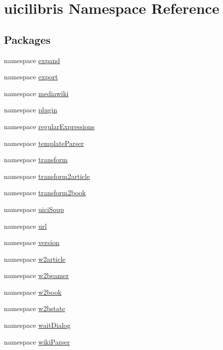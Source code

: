 \hypertarget{namespaceuicilibris}{\section{uicilibris \-Namespace \-Reference}
\label{namespaceuicilibris}
}
\subsection*{\-Packages}
\begin{DoxyCompactItemize}
\item 
namespace \hyperlink{namespaceuicilibris_1_1expand}{expand}
\item 
namespace \hyperlink{namespaceuicilibris_1_1export}{export}
\item 
namespace \hyperlink{namespaceuicilibris_1_1mediawiki}{mediawiki}
\item 
namespace \hyperlink{namespaceuicilibris_1_1plugin}{plugin}
\item 
namespace \hyperlink{namespaceuicilibris_1_1regularExpressions}{regular\-Expressions}
\item 
namespace \hyperlink{namespaceuicilibris_1_1templateParser}{template\-Parser}
\item 
namespace \hyperlink{namespaceuicilibris_1_1transform}{transform}
\item 
namespace \hyperlink{namespaceuicilibris_1_1transform2article}{transform2article}
\item 
namespace \hyperlink{namespaceuicilibris_1_1transform2book}{transform2book}
\item 
namespace \hyperlink{namespaceuicilibris_1_1uiciSoup}{uici\-Soup}
\item 
namespace \hyperlink{namespaceuicilibris_1_1url}{url}
\item 
namespace \hyperlink{namespaceuicilibris_1_1version}{version}
\item 
namespace \hyperlink{namespaceuicilibris_1_1w2article}{w2article}
\item 
namespace \hyperlink{namespaceuicilibris_1_1w2beamer}{w2beamer}
\item 
namespace \hyperlink{namespaceuicilibris_1_1w2book}{w2book}
\item 
namespace \hyperlink{namespaceuicilibris_1_1w2bstate}{w2bstate}
\item 
namespace \hyperlink{namespaceuicilibris_1_1waitDialog}{wait\-Dialog}
\item 
namespace \hyperlink{namespaceuicilibris_1_1wikiParser}{wiki\-Parser}
\end{DoxyCompactItemize}

